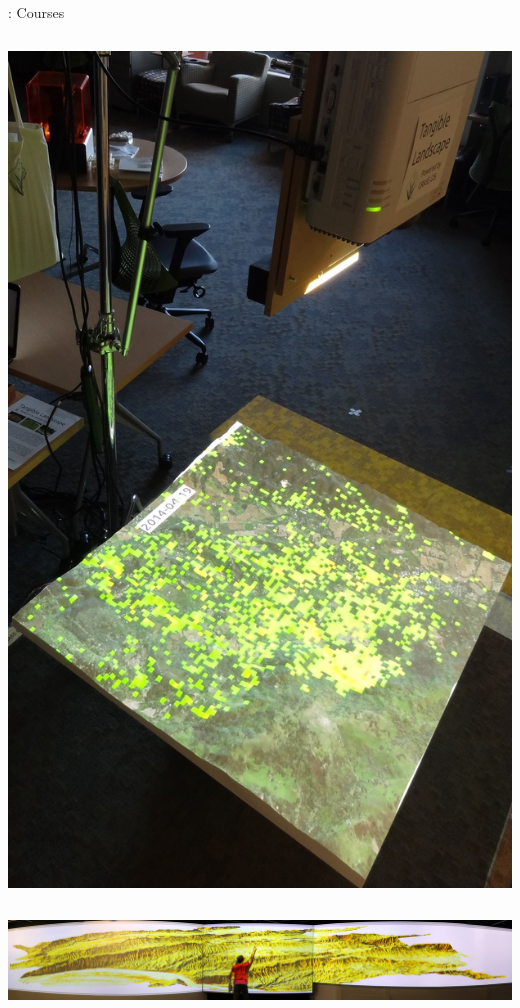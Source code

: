 \documentclass[xcolor={dvipsnames,usenames},beamer,aspectratio=169]{beamer}
\begin{document}
\begin{frame}{\geoforalllab: Courses}
\begin{columns}[c]
\href{https://www.youtube.com/channel/UCc37pVh-WE46Xkqeq-KZQsA}{%
\includegraphics[height=0.65\textheight]{./images/edu/tangible}%
}

\end{columns}

\href{https://www.lib.ncsu.edu/stories/large-scale-visualization-geospatial-data}{%
\includegraphics[width=\textwidth]{./images/edu/hunt_vis}%
}

\end{frame}
\end{document}
